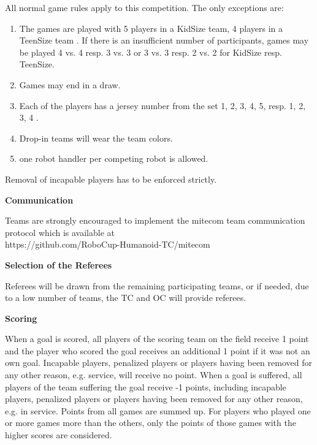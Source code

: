 All normal game rules apply to this competition. The only exceptions are:
\begin{enumerate}
\item The games are played with 5 players in a KidSize team, 4 players in a TeenSize team . If there is an insufficient number of participants, games may be played 4 vs. 4 resp. 3 vs. 3 or 3 vs. 3 resp. 2 vs. 2 for KidSize resp. TeenSize.
\item Games may end in a draw.
\item Each of the players has a jersey number from the set {1, 2, 3, 4, 5}, resp. {1, 2, 3, 4} .
\item Drop-in teams will wear the   team colors.
\item {} one robot handler per competing robot is allowed. 
\end{enumerate}

Removal of incapable players has to be enforced strictly.

\bigskip
 
{\bfseries Communication}

Teams are strongly encouraged to implement the mitecom team communication protocol which is available at \\
\textcolor[rgb]{0.0,0.0,0.49803922}{https://github.com/RoboCup-Humanoid-TC/mitecom}

\bigskip
 
{\bfseries Selection of the Referees}

Referees will be drawn from the remaining participating teams, or if needed, due to a low number of teams, the TC and OC will provide referees.

\bigskip
 
{\bfseries Scoring}

When a goal is scored, all players of the scoring team on the field receive 1 point and the player who scored the goal receives an additional 1 point if it was not an own goal.  Incapable players, penalized players or players having been removed for any other reason, e.g. service, will receive no point. When a goal is suffered, all players of the team suffering the goal receive -1 points, including incapable players, penalized players or players having been removed for any other reason, e.g. in service. Points from all games are summed up. For players who played one or more games more than the others, only the points of those games with the higher scores are considered.

